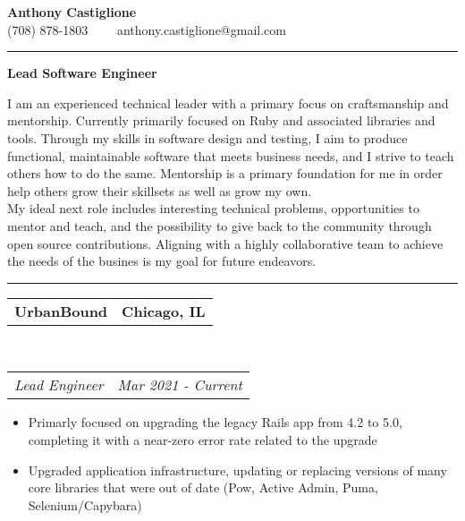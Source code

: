 \documentclass[10pt,letterpaper]{article}
\makeatletter
\newcommand{\headerrow}[2]
{\begin{tabular*}{\linewidth}{l@{\extracolsep{\fill}}r}
  #1 &
  #2 \\
\end{tabular*}}
\newenvironment{indentsection}[1]%
{\begin{list}{}%
  {\setlength{\leftmargin}{#1}}%
  \item[]%
}
{\end{list}}
\makeatother
\begin{document}
\begin{center}
  {\LARGE \textbf {Anthony Castiglione}} \\ (708) 878-1803 \ \ \textbullet \ \ anthony.castiglione@gmail.com
\end{center}
\hrule
\begin{center}
  {\Large \textbf {Lead Software Engineer}}
\end{center}
\par I am an experienced technical leader with a primary focus on craftsmanship and mentorship. Currently primarily focused on Ruby and associated libraries and tools. Through my skills in software design and testing, I aim to produce functional, maintainable software that meets business needs, and I strive to teach others how to do the same. Mentorship is a primary foundation for me in order help others grow their skillsets as well as grow my own.
\noindent \mbox{}\\

My ideal next role includes interesting technical problems, opportunities to mentor and teach, and the possibility to give back to the community through open source contributions. Aligning with a highly collaborative team to achieve the needs of the busines is my goal for future endeavors.

\vspace{0.2in}
\hrule
\vspace{0.2in}


\begin{indentsection}{\parindent}
  \headerrow
    {\textbf{UrbanBound} }
    {\textbf{Chicago, IL}}
  \\
  \headerrow
    {\emph{Lead Engineer}}
    {\emph{Mar 2021 - Current}}

  \begin{itemize}
  \renewcommand{\labelitemi}{$-$}
  \vspace{-0.1in}
    \item Primarly focused on upgrading the legacy Rails app from 4.2 to 5.0, completing it with a near-zero error rate related to the upgrade
    \item Upgraded application infrastructure, updating or replacing versions of many core libraries that were out of date (Pow, Active Admin, Puma, Selenium/Capybara)
  \end{itemize}
\end{indentsection}
\end{document}
